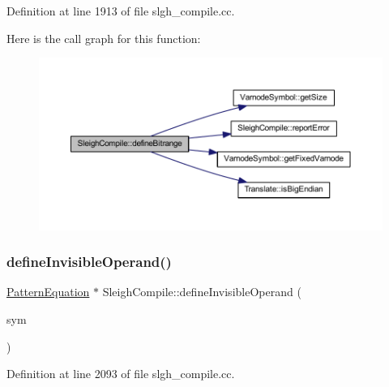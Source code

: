 Definition at line 1913 of file slgh\+\_\+compile.\+cc.

Here is the call graph for this function\+:
\nopagebreak
\begin{figure}[H]
\begin{center}
\leavevmode
\includegraphics[width=350pt]{class_sleigh_compile_a5bab7ee59435857526ed02fd3071f4d7_cgraph}
\end{center}
\end{figure}
\mbox{\label{class_sleigh_compile_ab9d0f1be08e773533a23ef417399ac87}} 
\subsubsection{\texorpdfstring{defineInvisibleOperand()}{defineInvisibleOperand()}}
{\footnotesize\ttfamily \mbox{\hyperlink{class_pattern_equation}{Pattern\+Equation}} $\ast$ Sleigh\+Compile\+::define\+Invisible\+Operand (\begin{DoxyParamCaption}\item[{\mbox{\hyperlink{class_triple_symbol}{Triple\+Symbol}} $\ast$}]{sym }\end{DoxyParamCaption})}



Definition at line 2093 of file slgh\+\_\+compile.\+cc.

